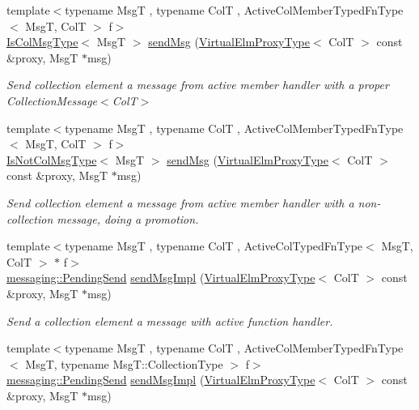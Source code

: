 \begin{DoxyCompactItemize}
{\footnotesize template$<$typename MsgT , typename ColT , Active\+Col\+Member\+Typed\+Fn\+Type$<$ Msg\+T, Col\+T $>$ f$>$ }\\\hyperlink{structvt_1_1vrt_1_1collection_1_1_collection_manager_a21c21612c806016788057aeab142af20}{Is\+Col\+Msg\+Type}$<$ MsgT $>$ \hyperlink{structvt_1_1vrt_1_1collection_1_1_collection_manager_a3ea2d130487c02b8dbda05b7befda88d}{send\+Msg} (\hyperlink{namespacevt_1_1vrt_a620a5c8c59d13e513f690c74b4af516f}{Virtual\+Elm\+Proxy\+Type}$<$ ColT $>$ const \&proxy, MsgT $\ast$msg)
\begin{DoxyCompactList}\small\item\em Send collection element a message from active member handler with a proper {\ttfamily Collection\+Message$<$\+Col\+T$>$} \end{DoxyCompactList}\item 
{\footnotesize template$<$typename MsgT , typename ColT , Active\+Col\+Member\+Typed\+Fn\+Type$<$ Msg\+T, Col\+T $>$ f$>$ }\\\hyperlink{structvt_1_1vrt_1_1collection_1_1_collection_manager_ae376deeefd4f89a0b1c93849977715d9}{Is\+Not\+Col\+Msg\+Type}$<$ MsgT $>$ \hyperlink{structvt_1_1vrt_1_1collection_1_1_collection_manager_a229f96a5075562ee92743d69fc285254}{send\+Msg} (\hyperlink{namespacevt_1_1vrt_a620a5c8c59d13e513f690c74b4af516f}{Virtual\+Elm\+Proxy\+Type}$<$ ColT $>$ const \&proxy, MsgT $\ast$msg)
\begin{DoxyCompactList}\small\item\em Send collection element a message from active member handler with a non-\/collection message, doing a promotion. \end{DoxyCompactList}\item 
{\footnotesize template$<$typename MsgT , typename ColT , Active\+Col\+Typed\+Fn\+Type$<$ Msg\+T, Col\+T $>$ $\ast$ f$>$ }\\\hyperlink{structvt_1_1messaging_1_1_pending_send}{messaging\+::\+Pending\+Send} \hyperlink{structvt_1_1vrt_1_1collection_1_1_collection_manager_afc14691c6992cc5d7e51118b1386b67c}{send\+Msg\+Impl} (\hyperlink{namespacevt_1_1vrt_a620a5c8c59d13e513f690c74b4af516f}{Virtual\+Elm\+Proxy\+Type}$<$ ColT $>$ const \&proxy, MsgT $\ast$msg)
\begin{DoxyCompactList}\small\item\em Send a collection element a message with active function handler. \end{DoxyCompactList}\item 
{\footnotesize template$<$typename MsgT , typename ColT , Active\+Col\+Member\+Typed\+Fn\+Type$<$ Msg\+T, typename Msg\+T\+::\+Collection\+Type $>$ f$>$ }\\\hyperlink{structvt_1_1messaging_1_1_pending_send}{messaging\+::\+Pending\+Send} \hyperlink{structvt_1_1vrt_1_1collection_1_1_collection_manager_afc14691c6992cc5d7e51118b1386b67c}{send\+Msg\+Impl} (\hyperlink{namespacevt_1_1vrt_a620a5c8c59d13e513f690c74b4af516f}{Virtual\+Elm\+Proxy\+Type}$<$ ColT $>$ const \&proxy, MsgT $\ast$msg)

\end{DoxyCompactItemize}
